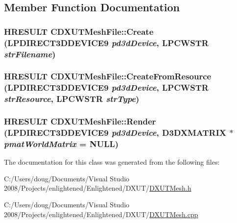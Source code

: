 \subsection{Member Function Documentation}
\hypertarget{class_c_d_x_u_t_mesh_file_abdbbccbd662dde43e4b8901d81ee763a}{
\subsubsection[{Create}]{\setlength{\rightskip}{0pt plus 5cm}HRESULT CDXUTMeshFile::Create (LPDIRECT3DDEVICE9 {\em pd3dDevice}, \/  LPCWSTR {\em strFilename})}}
\label{class_c_d_x_u_t_mesh_file_abdbbccbd662dde43e4b8901d81ee763a}
\hypertarget{class_c_d_x_u_t_mesh_file_aaddc2094bb8721b5310b4a14f884a1e2}{
\subsubsection[{CreateFromResource}]{\setlength{\rightskip}{0pt plus 5cm}HRESULT CDXUTMeshFile::CreateFromResource (LPDIRECT3DDEVICE9 {\em pd3dDevice}, \/  LPCWSTR {\em strResource}, \/  LPCWSTR {\em strType})}}
\label{class_c_d_x_u_t_mesh_file_aaddc2094bb8721b5310b4a14f884a1e2}
\hypertarget{class_c_d_x_u_t_mesh_file_afaab9ad6b0aa2c93dce458fd5866571f}{
\subsubsection[{Render}]{\setlength{\rightskip}{0pt plus 5cm}HRESULT CDXUTMeshFile::Render (LPDIRECT3DDEVICE9 {\em pd3dDevice}, \/  D3DXMATRIX $\ast$ {\em pmatWorldMatrix} = {\ttfamily NULL})}}
\label{class_c_d_x_u_t_mesh_file_afaab9ad6b0aa2c93dce458fd5866571f}


The documentation for this class was generated from the following files:\begin{DoxyCompactItemize}
\item 
C:/Users/doug/Documents/Visual Studio 2008/Projects/enlightened/Enlightened/DXUT/\hyperlink{_d_x_u_t_mesh_8h}{DXUTMesh.h}\item 
C:/Users/doug/Documents/Visual Studio 2008/Projects/enlightened/Enlightened/DXUT/\hyperlink{_d_x_u_t_mesh_8cpp}{DXUTMesh.cpp}\end{DoxyCompactItemize}
